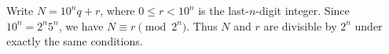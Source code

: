 Write $N=10^nq+r$, where $0\le r<10^n$ is the last-$n$-digit integer. Since $10^n=2^n5^n$, we have $N\equiv r\pmod{2^n}$. Thus $N$ and $r$ are divisible by $2^n$ under exactly the same conditions.
